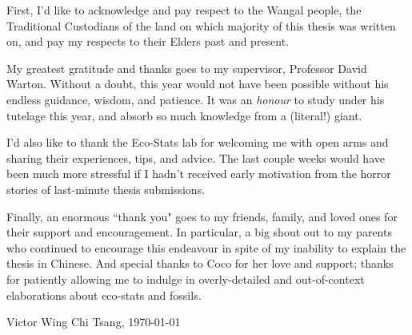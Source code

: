 
{\bigskip} First, I'd like to acknowledge and pay respect to the Wangal people, the Traditional Custodians of the land on which majority of this thesis was written on, and pay my respects to their Elders past and present.

{\bigskip} My greatest gratitude and thanks goes to my supervisor, Professor David Warton. Without a doubt, this year would not have been possible without his endless guidance, wisdom, and patience. It was an \textit{honour} to study under his tutelage this year, and absorb so much knowledge from a (literal!) giant.

{\bigskip} I'd also like to thank the Eco-Stats lab for welcoming me with open arms and sharing their experiences, tips, and advice. The last couple weeks would have been much more stressful if I hadn't received early motivation from the horror stories of last-minute thesis submissions.

{\bigskip} Finally, an enormous ``thank you" goes to my friends, family, and loved ones for their support and encouragement. In particular, a big shout out to my parents who continued to encourage this endeavour in spite of my inability to explain the thesis in Chinese. And special thanks to Coco for her love and support; thanks for patiently allowing me to indulge in overly-detailed and out-of-context elaborations about eco-stats and fossils.

{\bigskip\bigskip\bigskip}Victor Wing Chi Tsang, \today